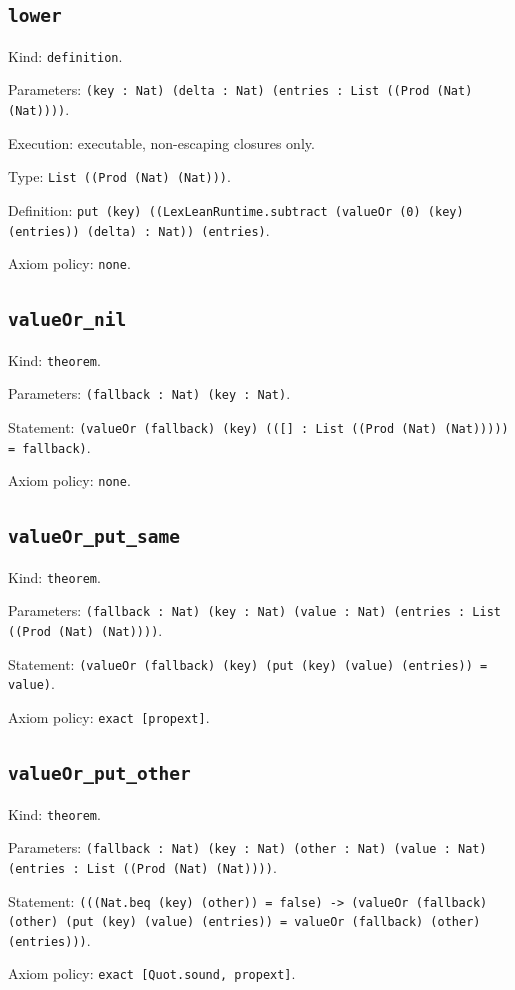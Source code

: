 \documentclass[11pt]{article}
\begin{document}
\subsection*{\texttt{lower}}
\noindent Kind: \texttt{definition}.\par
\noindent Parameters: \texttt{(key : Nat) (delta : Nat) (entries : List ((Prod (Nat) (Nat))))}.\par
\noindent Execution: executable, non-escaping closures only.\par
\noindent Type: \texttt{List ((Prod (Nat) (Nat)))}.\par
\noindent Definition: \texttt{put (key) ((LexLeanRuntime.subtract (valueOr (0) (key) (entries)) (delta) : Nat)) (entries)}.\par
\noindent Axiom policy: \texttt{none}.\par
\subsection*{\texttt{valueOr\_nil}}
\noindent Kind: \texttt{theorem}.\par
\noindent Parameters: \texttt{(fallback : Nat) (key : Nat)}.\par
\noindent Statement: \texttt{(valueOr (fallback) (key) (([] : List ((Prod (Nat) (Nat))))) = fallback)}.\par
\noindent Axiom policy: \texttt{none}.\par
\subsection*{\texttt{valueOr\_put\_same}}
\noindent Kind: \texttt{theorem}.\par
\noindent Parameters: \texttt{(fallback : Nat) (key : Nat) (value : Nat) (entries : List ((Prod (Nat) (Nat))))}.\par
\noindent Statement: \texttt{(valueOr (fallback) (key) (put (key) (value) (entries)) = value)}.\par
\noindent Axiom policy: \texttt{exact [propext]}.\par
\subsection*{\texttt{valueOr\_put\_other}}
\noindent Kind: \texttt{theorem}.\par
\noindent Parameters: \texttt{(fallback : Nat) (key : Nat) (other : Nat) (value : Nat) (entries : List ((Prod (Nat) (Nat))))}.\par
\noindent Statement: \texttt{(((Nat.beq (key) (other)) = false) -> (valueOr (fallback) (other) (put (key) (value) (entries)) = valueOr (fallback) (other) (entries)))}.\par
\noindent Axiom policy: \texttt{exact [Quot.sound, propext]}.\par
\end{document}
